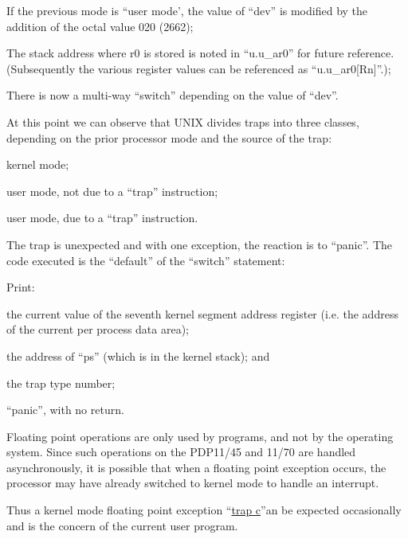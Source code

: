 \item[2700:] If the previous mode is ``user
 mode', the value of ``dev'' is
 modified by the addition of the
 octal value 020 (2662);

\item[2701:] The stack address where r0 is
 stored is noted in ``u.u\_ar0'' for
 future reference. (Subsequently
the various register values can
be referenced as ``u.u\_ar0[Rn]''.);

\item[2702:] There is now a multi-way ``switch''
 depending on the value of ``dev''.
\ed

At this point we can observe that UNIX
divides traps into three classes,
depending on the prior processor mode
and the source of the trap:

\bd
\item[(a)] kernel mode;

\item[(b)] user mode, not due to a ``trap''
 instruction;

\item[(c)] user mode, due to a ``trap''
 instruction.
\ed



The trap is unexpected and with one
exception, the reaction is to ``panic''.
The code executed is the ``default'' of
the ``switch'' statement:

\bd
\item[2716:] Print:

\bi
\item the current value of the seventh
kernel segment address register
(i.e. the address of the current
per process data area);

\item the address of ``ps'' (which is in
the kernel stack); and

\item the trap type number;
\ei

\item[2719:] ``panic'', with no return.
\ed

Floating point operations are only used
by programs, and not by the operating
system. Since such operations on the
PDP11/45 and 11/70 are handled asynchronously, it is possible that when a
floating point exception occurs, the
processor may have already switched to
kernel mode to handle an interrupt.

Thus a kernel mode floating point
exception ``\href{./v6/ken/trap c}{trap c}''an be expected occasionally and is the concern of the
current user program.

